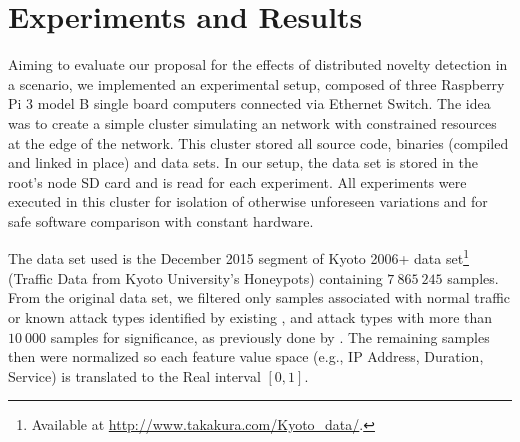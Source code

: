 
\section{Experiments and Results}
\label{sec:experiments}


Aiming to evaluate our proposal for the effects of distributed novelty detection
in a \iot \nids scenario, we implemented an experimental setup, composed of three Raspberry Pi 3 model B single board
computers connected via Ethernet Switch. The idea was to create a simple cluster simulating an
\iot network with constrained resources at the edge of the network.
This cluster stored all source code, binaries (compiled and linked in place) and
data sets.
In our setup, the data set is stored in the root's node SD card and is read for
each experiment.
All experiments were executed in this cluster for isolation of otherwise
unforeseen variations and for safe software comparison with constant hardware.

The data set used is the December 2015 segment of
Kyoto 2006+ data set\footnote{Available at \url{http://www.takakura.com/Kyoto\_data/}.}
(Traffic Data from Kyoto University's Honeypots) \cite{Song2011}
containing $7\:865\:245$ samples.
From the original data set, we filtered only samples associated with normal traffic
or known attack types identified by existing \nids, and attack types with more
than $10\:000$ samples for significance, as previously done by
\cite{Cassales2019a}.
The remaining samples then were normalized so each feature value space (e.g., IP
Address, Duration, Service) is translated to the Real interval $[0, 1]$.


